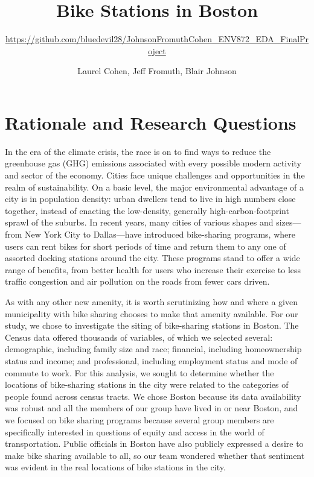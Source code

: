 \documentclass[
  12pt,
]{article}
\title{Bike Stations in Boston}
\subtitle{\url{https://github.com/bluedevil28/JohnsonFromuthCohen_ENV872_EDA_FinalProject}}
\author{Laurel Cohen, Jeff Fromuth, Blair Johnson}
\date{}
\begin{document}
\maketitle

\newpage

\hypertarget{rationale-and-research-questions}{%
\section{Rationale and Research
Questions}\label{rationale-and-research-questions}}

In the era of the climate crisis, the race is on to find ways to reduce
the greenhouse gas (GHG) emissions associated with every possible modern
activity and sector of the economy. Cities face unique challenges and
opportunities in the realm of sustainability. On a basic level, the
major environmental advantage of a city is in population density: urban
dwellers tend to live in high numbers close together, instead of
enacting the low-density, generally high-carbon-footprint sprawl of the
suburbs. In recent years, many cities of various shapes and sizes---from
New York City to Dallas---have introduced bike-sharing programs, where
users can rent bikes for short periods of time and return them to any
one of assorted docking stations around the city. These programs stand
to offer a wide range of benefits, from better health for users who
increase their exercise to less traffic congestion and air pollution on
the roads from fewer cars driven.

As with any other new amenity, it is worth scrutinizing how and where a
given municipality with bike sharing chooses to make that amenity
available. For our study, we chose to investigate the siting of
bike-sharing stations in Boston. The Census data offered thousands of
variables, of which we selected several: demographic, including family
size and race; financial, including homeownership status and income; and
professional, including employment status and mode of commute to work.
For this analysis, we sought to determine whether the locations of
bike-sharing stations in the city were related to the categories of
people found across census tracts. We chose Boston because its data
availability was robust and all the members of our group have lived in
or near Boston, and we focused on bike sharing programs because several
group members are specifically interested in questions of equity and
access in the world of transportation. Public officials in Boston have
also publicly expressed a desire to make bike sharing available to all,
so our team wondered whether that sentiment was evident in the real
locations of bike stations in the city.
\end{document}
